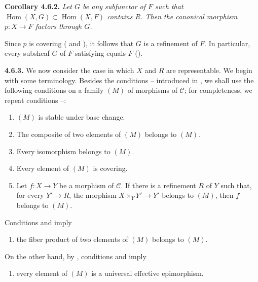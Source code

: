 \medskip
\noindent{}\textbf{Corollary 4.6.2.}
\textit{Let \(G\) be any subfunctor of \(F\) such that
\(\operatorname{Hom}(X,G)\subset\operatorname{Hom}(X,F)\) contains
\(R\). Then the canonical morphism \(p:X\to F\) factors through \(G\).}

Since \(p\) is covering ( and ), it follows that \(G\) is a
refinement of \(F\). In particular, every subsheaf \(G\) of \(F\)
satisfying  equals \(F\) ().

\medskip
\noindent{}\textbf{4.6.3.}
We now consider the case in which \(X\) and \(R\) are representable.
We begin with some terminology. Besides the conditions --
introduced in , we shall use the following conditions on a family
\((M)\) of morphisms of \(\mathscr C\); for completeness, we repeat
conditions --:
\begin{enumerate}
 \item[(a)] \((M)\) is stable under base change.
 \item[(b)] The composite of two elements of \((M)\) belongs to \((M)\).
 \item[(c)] Every isomorphism belongs to \((M)\).
 \item[\((d_{\mathcal T})\)] Every element of \((M)\) is covering.
 \item[\((e_{\mathcal T})\)] Let \(f:X\to Y\) be a morphism of
 \(\mathscr C\). If there is a refinement \(R\) of \(Y\) such that,
 for every \(Y'\to R\), the morphism
 \(X\times_Y Y'\to Y'\) belongs to \((M)\), then \(f\) belongs to
 \((M)\).
\end{enumerate}
Conditions  and  imply
\begin{enumerate}
 \item[\((a')\)] the fiber product of two elements of \((M)\) belongs
 to \((M)\).
\end{enumerate}
On the other hand, by , conditions  and
 imply
\begin{enumerate}
 \item[\((d')\)] every element of \((M)\) is a universal effective
 epimorphism.
\end{enumerate}

